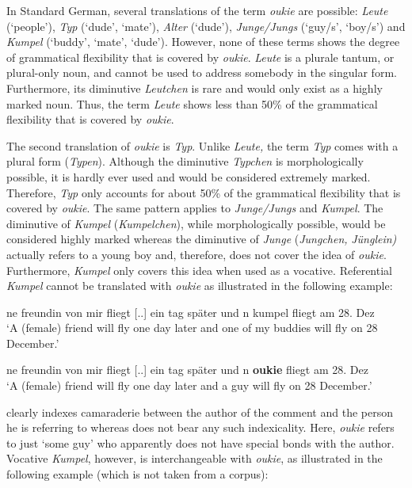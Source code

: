 \documentclass[output=paper]{langsci/langscibook}
\begin{document}
In Standard German, several translations of the term \textit{oukie} are possible: \textit{Leute} (‘people’), \textit{Typ} (‘dude’, ‘mate’), \textit{Alter} (‘dude’), \textit{Junge/Jungs} (‘guy/s’, ‘boy/s’) and \textit{Kumpel} (‘buddy’, ‘mate’, ‘dude’). However, none of these terms shows the degree of grammatical flexibility that is covered by \textit{oukie}. \textit{Leute} is a plurale tantum, or plural-only noun, and cannot be used to address somebody in the singular form. Furthermore, its diminutive \textit{Leutchen} is rare and would only exist as a highly marked noun. Thus, the term \textit{Leute} shows less than 50\% of the grammatical flexibility that is covered by \textit{oukie}.

The second translation of \textit{oukie} is \textit{Typ}. Unlike \textit{Leute,} the term \textit{Typ} comes with a plural form (\textit{Typen}). Although the diminutive \textit{Typchen} is morphologically possible, it is hardly ever used and would be considered extremely marked. Therefore, \textit{Typ} only accounts for about 50\% of the grammatical flexibility that is covered by \textit{oukie}. The same pattern applies to \textit{Junge/Jungs} and \textit{Kumpel}. The diminutive of \textit{Kumpel} (\textit{Kumpelchen}), while morphologically possible, would be considered highly marked whereas the diminutive of \textit{Junge} (\textit{Jungchen,} \textit{Jünglein)} actually refers to a young boy and, therefore, does not cover the idea of \textit{oukie}. Furthermore, \textit{Kumpel} only covers this idea when used as a vocative. Referential \textit{Kumpel} cannot be translated with \textit{oukie} as illustrated in the following example: 

\ea\label{ex:radke:18}
 ne freundin von mir fliegt [..] ein tag später und n kumpel fliegt am 28. Dez\smallskip\\\relax
‘A (female) friend will fly one day later and one of my buddies will fly on 28 December.’\\
\z


\ea\label{ex:radke:19}
 ne freundin von mir fliegt [..] ein tag später und n \textbf{oukie} fliegt am 28. Dez\smallskip\\\relax
‘A (female) friend will fly one day later and a guy will fly on 28 December.’\\
\z

 clearly indexes camaraderie between the author of the comment and the person he is referring to whereas  does not bear any such indexicality. Here, \textit{oukie} refers to just ‘some guy’ who apparently does not have special bonds with the author. Vocative \textit{Kumpel}, however, is interchangeable with \textit{oukie}, as illustrated in the following example (which is not taken from a corpus):
\end{document}
